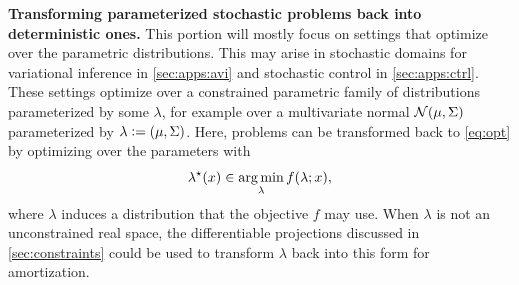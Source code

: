 \textbf{Transforming parameterized stochastic problems
  back into deterministic ones.}
This portion will mostly focus on settings that
optimize over the parametric distributions.
This may arise in stochastic domains for variational inference in
\cref{sec:apps:avi} and stochastic control in \cref{sec:apps:ctrl}.
These settings optimize over a constrained parametric family
of distributions parameterized by some $\lambda$, for example
over a multivariate normal ${\mathcal{N}}(\mu, \Sigma)$ parameterized
by $\lambda\vcentcolon= (\mu, \Sigma)$.
Here, problems can be transformed back to \cref{eq:opt} by
optimizing over the parameters with
\begin{equation}
  \lambda^\star(x) \in \operatorname*{arg\,min}_{\lambda} f(\lambda; x),
  \label{eq:normal-opt}
\end{equation}
where $\lambda$ induces a distribution that the
objective $f$ may use.
When $\lambda$ is not an unconstrained real space, the
differentiable projections discussed in \cref{sec:constraints}
could be used to transform $\lambda$ back into this form for amortization.

